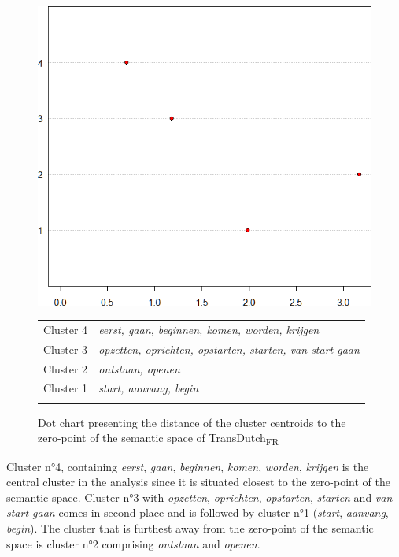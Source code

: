 \begin{figure}
\includegraphics[height=.4\textheight]{figures/Vandevoorde2-img81.png}\vspace*{\baselineskip}
\scriptsize
\begin{tabular}{l>{\itshape}l}
\lsptoprule
Cluster 4 & eerst{\normalfont,} gaan{\normalfont,} beginnen{\normalfont,} komen{\normalfont,} worden{\normalfont,} krijgen\\
Cluster 3 & opzetten{\normalfont,} oprichten{\normalfont,} opstarten{\normalfont,} starten{\normalfont,} van start gaan\\
Cluster 2 & ontstaan{\normalfont,} openen\\
Cluster 1 & start{\normalfont,} aanvang{\normalfont,} begin\\
\lspbottomrule
\end{tabular}
\normalsize
\caption{\label{fig:4:78}Dot chart presenting the distance of the cluster centroids to the zero-point of the semantic space of TransDutch\textsubscript{FR}}
\end{figure}

Cluster n°4, containing \textit{eerst}, \textit{gaan}, \textit{beginnen}, \textit{komen}, \textit{worden}, \textit{krijgen} is the central cluster in the analysis since it is situated closest to the zero-point of the semantic space. Cluster n°3 with \textit{opzetten}, \textit{oprichten}, \textit{opstarten}, \textit{starten} and \textit{van start gaan} comes in second place and is followed by cluster n°1 (\textit{start}, \textit{aanvang}, \textit{begin}). The cluster that is furthest away from the zero-point of the semantic space is cluster n°2 comprising \textit{ontstaan} and \textit{openen}.

